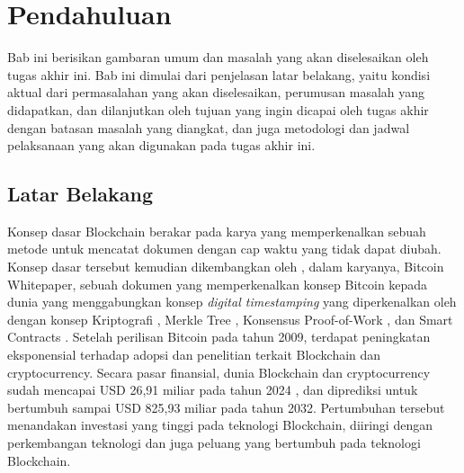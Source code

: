 \chapter{Pendahuluan}


Bab ini berisikan gambaran umum dan masalah yang akan diselesaikan oleh tugas akhir ini. Bab ini dimulai dari penjelasan latar belakang, yaitu kondisi aktual dari permasalahan yang akan diselesaikan, perumusan masalah yang didapatkan, dan dilanjutkan oleh tujuan yang ingin dicapai oleh tugas akhir dengan batasan masalah yang diangkat, dan juga metodologi dan jadwal pelaksanaan yang akan digunakan pada tugas akhir ini. 

\section{Latar Belakang}
\label{sec:latarbelakang}

Konsep dasar Blockchain berakar pada karya \cite{haber1991time} yang memperkenalkan sebuah metode untuk mencatat dokumen dengan cap waktu yang tidak dapat diubah. Konsep dasar tersebut kemudian dikembangkan oleh \cite{nakamoto2008bitcoin}, dalam karyanya, Bitcoin Whitepaper, sebuah dokumen yang memperkenalkan konsep Bitcoin kepada dunia yang menggabungkan konsep \textit{digital timestamping} yang diperkenalkan oleh \cite{haber1991time} dengan konsep Kriptografi \parencite{hellman1976new} \parencite{standard1995secure}, Merkle Tree \parencite{merkle1987digital}, Konsensus Proof-of-Work \parencite{dwork1992pricing}, dan Smart Contracts \parencite{szabo1997formalizing}. Setelah perilisan Bitcoin pada tahun 2009, terdapat peningkatan eksponensial terhadap adopsi dan penelitian terkait Blockchain dan cryptocurrency. Secara pasar finansial, dunia Blockchain dan cryptocurrency sudah mencapai USD 26,91 miliar pada tahun 2024 \parencite{rosencrance2024top}, dan diprediksi untuk bertumbuh sampai USD 825,93 miliar pada tahun 2032. Pertumbuhan tersebut menandakan investasi yang tinggi pada teknologi Blockchain, diiringi dengan perkembangan teknologi dan juga peluang yang bertumbuh pada teknologi Blockchain. 

